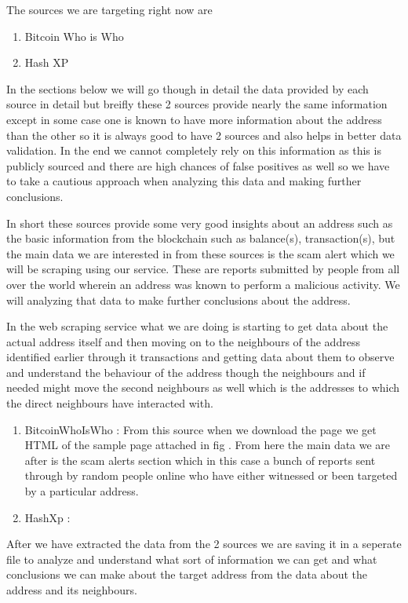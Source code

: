 \documentclass{article}
\begin{document}
        The sources we are targeting right now are 
        \begin{enumerate}
            \item Bitcoin Who is Who \cite{bitcoinwhoswho}
            \item Hash XP \cite{hashxp.org}
        \end{enumerate}
        In the sections below we will go though in detail the data provided by each source in detail but breifly these 2 sources provide nearly the same information except in some case one is known to have more information about the address than the other so it is always good to have 2 sources and also helps in better data validation. In the end we cannot completely rely on this information as this is publicly sourced and there are high chances of false positives as well so we have to take a cautious approach when analyzing this data and making further conclusions. 
        
        In short these sources provide some very good insights about an address such as the basic information from the blockchain such as balance(s), transaction(s), but the main data we are interested in from these sources is the scam alert which we will be scraping using our service. These are reports submitted by people from all over the world wherein an address was known to perform a malicious activity. We will analyzing that data to make further conclusions about the address.
        
        In the web scraping service what we are doing is starting to get data about the actual address itself and then moving on to the neighbours of the address identified earlier through it transactions and getting data about them to observe and understand the behaviour of the address though the neighbours and if needed might move the second neighbours as well which is the addresses to which the direct neighbours have interacted with.
        \begin{enumerate}
            \item BitcoinWhoIsWho : From this source when we download the page we get HTML of the sample page attached in fig \cite{} . From here the main data we are after is the scam alerts section which in this case a bunch of reports sent through by random people online who have either witnessed or been targeted by a particular address. 
            \item HashXp : 
        \end{enumerate}
        
        After we have extracted the data from the 2 sources we are saving it in a seperate file to analyze and understand what sort of information we can get and what conclusions we can make about the target address from the data about the address and its neighbours.
\end{document}
